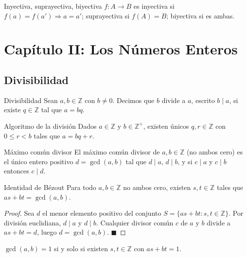 \documentclass[12pt]{article}
\begin{document}
\begin{definicion}[1.5]{Inyectiva, suprayectiva, biyectiva}
$f : A \to B$ es inyectiva si $f(a) = f(a') \Rightarrow a = a'$; suprayectiva si $f(A) = B$; biyectiva si es ambas.
\end{definicion}

\section{Capítulo II: Los Números Enteros}

\subsection{Divisibilidad}

\begin{definicion}[2.1]{Divisibilidad}
Sean $a, b \in \mathbb{Z}$ con $b \neq 0$. Decimos que $b$ divide a $a$, escrito $b \mid a$, si existe $q \in \mathbb{Z}$ tal que $a = bq$.
\end{definicion}

\begin{teorema}[2.1]{Algoritmo de la división}
Dados $a \in \mathbb{Z}$ y $b \in \mathbb{Z}^+$, existen únicos $q, r \in \mathbb{Z}$ con $0 \leq r < b$ tales que $a = bq + r$.
\end{teorema}

\begin{definicion}[2.2]{Máximo común divisor}
El máximo común divisor de $a, b \in \mathbb{Z}$ (no ambos cero) es el único entero positivo $d = \gcd(a,b)$ tal que $d \mid a$, $d \mid b$, y si $c \mid a$ y $c \mid b$ entonces $c \mid d$.
\end{definicion}

\begin{teorema}[2.2]{Identidad de Bézout}
Para todo $a, b \in \mathbb{Z}$ no ambos cero, existen $s, t \in \mathbb{Z}$ tales que $as + bt = \gcd(a,b)$.
\end{teorema}
\begin{proof}
Sea $d$ el menor elemento positivo del conjunto $S = \{as + bt : s,t \in \mathbb{Z}\}$. Por división euclidiana, $d \mid a$ y $d \mid b$. Cualquier divisor común $c$ de $a$ y $b$ divide a $as + bt = d$, luego $d = \gcd(a,b)$. $\blacksquare$
\end{proof}

\begin{corolario}[2.1]{}
$\gcd(a,b) = 1$ si y solo si existen $s,t \in \mathbb{Z}$ con $as + bt = 1$.
\end{corolario}
\end{document}
